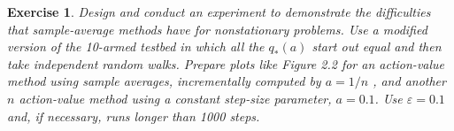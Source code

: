 \documentclass[answers]{exam}
\newtheorem{exercise}[theorem]{Exercise}
\theoremstyle{definition}
\theoremstyle{remark}
\newcommand{\e}{\varepsilon}
\begin{document}


\begin{exercise}
Design and conduct an experiment to demonstrate the difficulties that sample-average methods have for nonstationary problems. Use a modified version of the 10-armed testbed in which all the $q_{\ast}(a)$ start out equal and then take independent random walks. Prepare plots like Figure 2.2 for an action-value method using sample averages, incrementally computed by $a = 1/n$ , and another $n$ action-value method using a constant step-size parameter, $a = 0.1$. Use $\e = 0.1$ and, if necessary, runs longer than 1000 steps.    
\end{exercise}
\begin{solution}




    
\end{solution}
\end{document}
